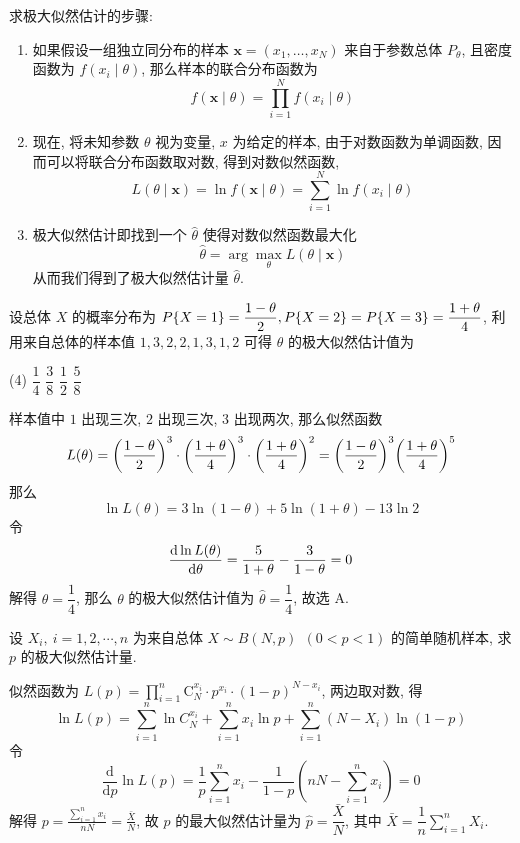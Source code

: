 求极大似然估计的步骤:
\begin{enumerate}[label=(\arabic{*})]
    \item 如果假设一组独立同分布的样本 $ \boldsymbol{x}=\left(x_{1}, \ldots, x_{N}\right) $ 来自于参数总体 $ P_{\theta} $, 且密度函数为 $ f\left(x_{i} \mid \theta\right) $, 那么样本的联合分布函数为
          $$
              f(\boldsymbol{x} \mid \theta)=\prod_{i=1}^{N} f\left(x_{i} \mid \theta\right)
          $$
    \item 现在, 将未知参数 $ \theta $ 视为变量, $ x $ 为给定的样本, 由于对数函数为单调函数, 因而可以将联合分布函数取对数, 得到对数似然函数,
          $$
              L(\theta \mid \boldsymbol{x})=\ln f(\boldsymbol{x} \mid \theta)=\sum_{i=1}^{N} \ln f\left(x_{i} \mid \theta\right)
          $$
    \item 极大似然估计即找到一个 $ \hat{\theta} $ 使得对数似然函数最大化
          $$
              \hat{\theta}=\arg \max _{\theta} L(\theta \mid \boldsymbol{x})
          $$
          从而我们得到了极大似然估计量 $ \hat{\theta} $.
\end{enumerate}

\begin{example}
    设总体 $X$ 的概率分布为 $P\qty{X=1}=\dfrac{1-\theta}{2},P\qty{X=2}=P\qty{X=3}=\dfrac{1+\theta}{4}$, 利用来自总体的样本值 $1,3,2,2,1,3,1,2$ 可得 $\theta$ 的极大似然估计值为
    \begin{tasks}(4)
        \task $\dfrac{1}{4}$
        \task $\dfrac{3}{8}$
        \task $\dfrac{1}{2}$
        \task $\dfrac{5}{8}$
    \end{tasks}
\end{example}
\begin{solution}
    样本值中 $1$ 出现三次, $2$ 出现三次, $3$ 出现两次, 那么似然函数
    $$
        L(\theta)=\qty(\dfrac{1-\theta}{2})^3\cdot \qty(\dfrac{1+\theta}{4})^3\cdot \qty(\dfrac{1+\theta}{4})^2=\qty(\dfrac{1-\theta}{2})^3\qty(\dfrac{1+\theta}{4})^5
    $$
    那么
    $$
        \ln L(\theta)=3\ln(1-\theta)+5\ln(1+\theta)-13\ln 2
    $$
    令 $$
        \dv{\ln L(\theta)}{\theta}=\dfrac{5}{1+\theta}-\dfrac{3}{1-\theta}=0
    $$
    解得 $\theta=\dfrac{1}{4}$, 那么 $\theta$ 的极大似然估计值为 $\hat{\theta}=\dfrac{1}{4}$, 故选 A.
\end{solution}

\begin{example}
    设 $X_i,~i=1,2,\cdots,n$ 为来自总体 $X\sim B(N,p)~~(0<p<1)$ 的简单随机样本, 求 $p$ 的极大似然估计量.
\end{example}
\begin{solution}
    似然函数为 $\displaystyle L(p)=\prod_{i=1}^{n} \mathrm{C}_{N}^{x_{i}} \cdot p^{x_{i}} \cdot(1-p)^{N-x_{i}} $, 两边取对数, 得
    $$\ln L(p)=\sum_{i=1}^{n} \ln C_{N}^{x_{i}}+\sum_{i=1}^{n} x_{i} \ln p+\sum_{i=1}^{n}\left(N-X_{i}\right) \ln (1-p)$$
    令 $$\frac{\mathrm{d}}{\mathrm{d} p} \ln L(p)=\frac{1}{p} \sum_{i=1}^{n} x_{i}-\frac{1}{1-p}\left(n N-\sum_{i=1}^{n} x_{i}\right)=0$$
    解得 $\displaystyle p=\frac{\displaystyle \sum_{i=1}^{n} x_{i}}{n N}=\frac{\bar{X}}{N} $, 故 $ p $ 的最大似然估计量为 $ \hat{p}=\dfrac{\bar{X}}{N} $,
    其中 $ \displaystyle\bar{X}=\dfrac{1}{n} \sum_{i=1}^{n} X_{i} .$
\end{solution}

